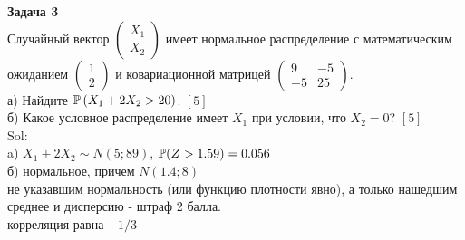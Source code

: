 \documentclass[pdftex,12pt,a4paper]{article}
\begin{document}
\textbf{Задача 3} \\ %
Случайный вектор  $\left(\begin{array}{c}
{X_{1} } \\ {X_{2} }
\end{array}\right)$  имеет нормальное распределение с
математическим ожиданием  $\left(\begin{array}{c} {1} \\ {2}
\end{array}\right)$  и ковариационной матрицей
$\left(\begin{array}{cc} {9} & {-5} \\ {-5} & {25}
\end{array}\right)$. \\
а) Найдите  $\P\left(X_{1} +2X_{2} >20\right)$. $[5]$ \\
б) Какое условное распределение имеет $X_{1}$ при условии, что $X_{2}=0$? $[5]$ \\
Sol: \\
a) $X_{1}+2X_{2}\sim N(5;89)$, $\P(Z>1.59)=0.056$ \\
б) нормальное, причем $N(1.4;8)$ \\
не указавшим нормальность (или функцию плотности явно), а только нашедшим среднее и дисперсию - штраф 2 балла. \\
корреляция равна $-1/3$ \\




\end{document}
